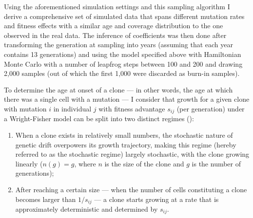 Using the aforementioned simulation settings and this sampling algorithm I derive a comprehensive set of simulated data that spans different mutation rates and fitness effects with a similar age and coverage distribution to the one observed in the real data. The inference of coefficients was then done after transforming the generation at sampling into years (assuming that each year contains 13 generations) and using the model specified above with Hamiltonian Monte Carlo with a number of leapfrog steps between 100 and 200 and drawing 2,000 samples (out of which the first 1,000 were discarded as burn-in samples). 

To determine the age at onset of a clone --- in other words, the age at which there was a single cell with a mutation --- I consider that growth for a given clone with mutation $i$ in individual $j$ with fitness advantage $s_{ij}$ (per generation) under a Wright-Fisher model can be split into two distinct regimes ():

\begin{enumerate}
    \item When a clone exists in relatively small numbers, the stochastic nature of genetic drift overpowers its growth trajectory, making this regime (hereby referred to as the stochastic regime) largely stochastic, with the clone growing linearly ($n(g) = g$, where $n$ is the size of the clone and $g$ is the number of generations);
    \item After reaching a certain size --- when the number of cells constituting a clone becomes larger than $1/s_{ij}$ --- a clone starts growing at a rate that is approximately deterministic and determined by $s_{ij}$.
\end{enumerate}

\begin{figure}
	\label{fig:wf-example}
\end{figure}

